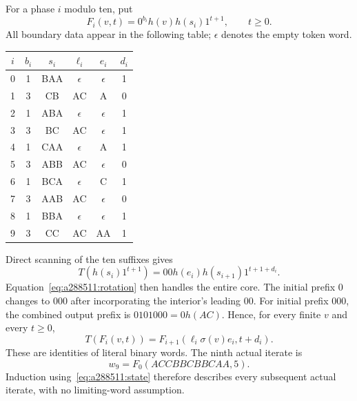 \documentclass[11pt]{article}
\begin{document}
For a phase $i$ modulo ten, put
\[
F_i(v,t)=0^{b_i}h(v)h(s_i)1^{t+1},\qquad t\ge0.
\]
All boundary data appear in the following table; $\epsilon$ denotes the
empty token word.
\begin{center}
\begin{tabular}{c|c|c|c|c|c}
$i$&$b_i$&$s_i$&$\ell_i$&$e_i$&$d_i$\\\hline
0&1&BAA&$\epsilon$&$\epsilon$&1\\
1&3&CB&AC&A&0\\
2&1&ABA&$\epsilon$&$\epsilon$&1\\
3&3&BC&AC&$\epsilon$&1\\
4&1&CAA&$\epsilon$&A&1\\
5&3&ABB&AC&$\epsilon$&0\\
6&1&BCA&$\epsilon$&C&1\\
7&3&AAB&AC&$\epsilon$&0\\
8&1&BBA&$\epsilon$&$\epsilon$&1\\
9&3&CC&AC&AA&1
\end{tabular}
\end{center}
Direct scanning of the ten suffixes gives
\[
T(h(s_i)1^{t+1})=00h(e_i)h(s_{i+1})1^{t+1+d_i}.
\]
Equation~\eqref{eq:a288511:rotation} then handles the entire core. The
initial prefix $0$ changes to $000$ after incorporating the interior's
leading $00$. For initial prefix $000$, the combined output prefix is
$0101000=0h(AC)$. Hence, for every finite $v$ and every $t\ge0$,
\begin{equation}
T(F_i(v,t))=F_{i+1}(\ell_i\sigma(v)e_i,t+d_i).
\label{eq:a288511:state}
\end{equation}
These are identities of literal binary words. The ninth actual iterate is
\[
w_9=F_0(ACCBBCBBCAA,5).
\]
Induction using~\eqref{eq:a288511:state} therefore describes every subsequent
actual iterate, with no limiting-word assumption.
\end{document}
